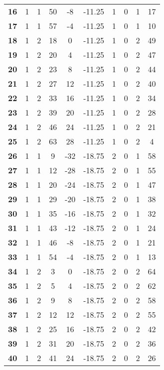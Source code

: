 \documentclass[12pt,letterpaper, onecolumn]{exam}
\begin{document}
\begin{longtable}{cccccccccc}
    \textbf{16} & 1 & 1 & 50 & -8 & -11.25 & 1 & 0 & 1 & 17 \\ 
    \textbf{17} & 1 & 1 & 57 & -4 & -11.25 & 1 & 0 & 1 & 10 \\ 
    \textbf{18} & 1 & 2 & 18 & 0 & -11.25 & 1 & 0 & 2 & 49 \\ 
    \textbf{19} & 1 & 2 & 20 & 4 & -11.25 & 1 & 0 & 2 & 47 \\ 
    \textbf{20} & 1 & 2 & 23 & 8 & -11.25 & 1 & 0 & 2 & 44 \\ 
    \textbf{21} & 1 & 2 & 27 & 12 & -11.25 & 1 & 0 & 2 & 40 \\ 
    \textbf{22} & 1 & 2 & 33 & 16 & -11.25 & 1 & 0 & 2 & 34 \\ 
    \textbf{23} & 1 & 2 & 39 & 20 & -11.25 & 1 & 0 & 2 & 28 \\ 
    \textbf{24} & 1 & 2 & 46 & 24 & -11.25 & 1 & 0 & 2 & 21 \\ 
    \textbf{25} & 1 & 2 & 63 & 28 & -11.25 & 1 & 0 & 2 & 4 \\ 
    \textbf{26} & 1 & 1 & 9 & -32 & -18.75 & 2 & 0 & 1 & 58 \\ 
    \textbf{27} & 1 & 1 & 12 & -28 & -18.75 & 2 & 0 & 1 & 55 \\ 
    \textbf{28} & 1 & 1 & 20 & -24 & -18.75 & 2 & 0 & 1 & 47 \\ 
    \textbf{29} & 1 & 1 & 29 & -20 & -18.75 & 2 & 0 & 1 & 38 \\ 
    \textbf{30} & 1 & 1 & 35 & -16 & -18.75 & 2 & 0 & 1 & 32 \\ 
    \textbf{31} & 1 & 1 & 43 & -12 & -18.75 & 2 & 0 & 1 & 24 \\ 
    \textbf{32} & 1 & 1 & 46 & -8 & -18.75 & 2 & 0 & 1 & 21 \\     \hline
    \textbf{33} & 1 & 1 & 54 & -4 & -18.75 & 2 & 0 & 1 & 13 \\ 
    \textbf{34} & 1 & 2 & 3 & 0 & -18.75 & 2 & 0 & 2 & 64 \\ 
    \textbf{35} & 1 & 2 & 5 & 4 & -18.75 & 2 & 0 & 2 & 62 \\ 
    \textbf{36} & 1 & 2 & 9 & 8 & -18.75 & 2 & 0 & 2 & 58 \\ 
    \textbf{37} & 1 & 2 & 12 & 12 & -18.75 & 2 & 0 & 2 & 55 \\ 
    \textbf{38} & 1 & 2 & 25 & 16 & -18.75 & 2 & 0 & 2 & 42 \\ 
    \textbf{39} & 1 & 2 & 31 & 20 & -18.75 & 2 & 0 & 2 & 36 \\ 
    \textbf{40} & 1 & 2 & 41 & 24 & -18.75 & 2 & 0 & 2 & 26 \\ 

\end{longtable}
\end{document}
